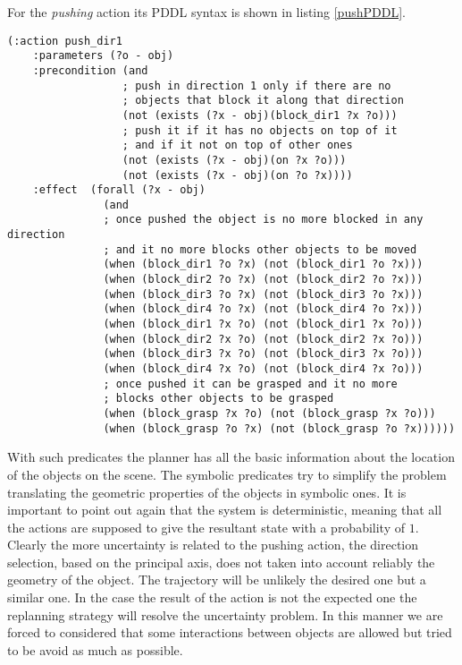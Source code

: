 For the \textit{pushing} action its PDDL syntax is shown in listing \ref{pushPDDL}.

\lstset{language=pddl}
\begin{lstlisting}[caption={PDDL syntax of the pushing action along direction 1},label=pushPDDL]
(:action push_dir1
    :parameters (?o - obj)
    :precondition (and
                  ; push in direction 1 only if there are no
                  ; objects that block it along that direction
                  (not (exists (?x - obj)(block_dir1 ?x ?o)))
                  ; push it if it has no objects on top of it
                  ; and if it not on top of other ones
                  (not (exists (?x - obj)(on ?x ?o)))
                  (not (exists (?x - obj)(on ?o ?x))))
    :effect  (forall (?x - obj)
               (and
               ; once pushed the object is no more blocked in any direction
               ; and it no more blocks other objects to be moved
               (when (block_dir1 ?o ?x) (not (block_dir1 ?o ?x)))
               (when (block_dir2 ?o ?x) (not (block_dir2 ?o ?x)))
               (when (block_dir3 ?o ?x) (not (block_dir3 ?o ?x)))
               (when (block_dir4 ?o ?x) (not (block_dir4 ?o ?x)))
               (when (block_dir1 ?x ?o) (not (block_dir1 ?x ?o)))
               (when (block_dir2 ?x ?o) (not (block_dir2 ?x ?o)))
               (when (block_dir3 ?x ?o) (not (block_dir3 ?x ?o)))
               (when (block_dir4 ?x ?o) (not (block_dir4 ?x ?o)))
               ; once pushed it can be grasped and it no more
               ; blocks other objects to be grasped
               (when (block_grasp ?x ?o) (not (block_grasp ?x ?o)))
               (when (block_grasp ?o ?x) (not (block_grasp ?o ?x))))))
\end{lstlisting}

\mbox{}


With such predicates the planner has all the basic information about the location of the objects on the scene. The symbolic predicates try to simplify the problem translating the geometric properties of the objects in symbolic ones. It is important to point out again that the system is deterministic, meaning that all the actions are supposed to give the resultant state with a probability of $1$. Clearly the more uncertainty is related to the pushing action, the direction selection, based on the principal axis, does not taken into account reliably the geometry of the object. The trajectory will be unlikely the desired one but a similar one. In the case the result of the action is not the expected one the replanning strategy will resolve the uncertainty problem. In this manner we are forced to considered that some interactions between objects are allowed but tried to be avoid as much as possible. 

